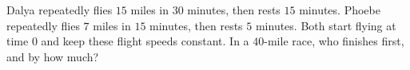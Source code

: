 Dalya repeatedly flies $15$ miles in $30$ minutes, then rests $15$ minutes. Phoebe repeatedly flies $7$ miles in $15$ minutes, then rests $5$ minutes. Both start flying at time $0$ and keep these flight speeds constant. In a $40$-mile race, who finishes first, and by how much?
